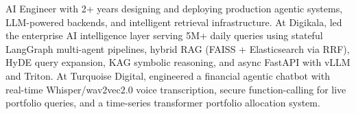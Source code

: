 \small{AI Engineer with 2+ years designing and deploying production agentic systems, LLM-powered backends, and intelligent retrieval infrastructure. At Digikala, led the enterprise AI intelligence layer serving 5M+ daily queries using stateful LangGraph multi-agent pipelines, hybrid RAG (FAISS + Elasticsearch via RRF), HyDE query expansion, KAG symbolic reasoning, and async FastAPI with vLLM and Triton. At Turquoise Digital, engineered a financial agentic chatbot with real-time Whisper/wav2vec2.0 voice transcription, secure function-calling for live portfolio queries, and a time-series transformer portfolio allocation system.}\vspace{3pt}
